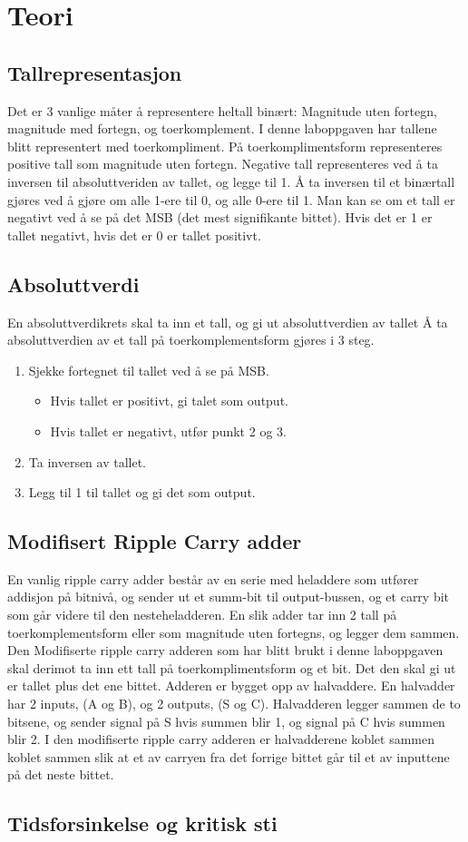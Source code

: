 \section{Teori}
  \subsection{Tallrepresentasjon}
    Det er 3 vanlige måter å representere heltall binært: Magnitude uten fortegn, magnitude med fortegn,
    og toerkomplement.
    I denne laboppgaven har tallene blitt representert med toerkompliment.
    På toerkomplimentsform representeres positive tall som magnitude uten fortegn.
    Negative tall representeres ved å ta inversen til absoluttveriden av tallet, og legge til 1.
    Å ta inversen til et binærtall gjøres ved å gjøre om alle 1-ere til 0, og alle 0-ere til 1.
    Man kan se om et tall er negativt ved å se på det MSB (det mest signifikante bittet). Hvis det er 1 er tallet negativt,
    hvis det er 0 er tallet positivt.
  \subsection{Absoluttverdi}
    En absoluttverdikrets skal ta inn et tall, og gi ut absoluttverdien av tallet
    Å ta absoluttverdien av et tall på toerkomplementsform gjøres i 3 steg.
    \begin{enumerate}
      \item Sjekke fortegnet til tallet ved å se på MSB.
      \begin{itemize}
        \item Hvis tallet er positivt, gi talet som output.
        \item Hvis tallet er negativt, utfør punkt 2 og 3.
      \end{itemize}
      \item Ta inversen av tallet.
      \item Legg til 1 til tallet og gi det som output.
    \end{enumerate}
  \subsection{Modifisert Ripple Carry adder}
    En vanlig ripple carry adder består av en serie med heladdere som utfører addisjon på bitnivå, og sender ut et summ-bit til output-bussen, og et carry bit som går videre til den nesteheladderen. En slik adder tar inn 2 tall på toerkomplementsform eller som magnitude uten fortegns, og legger dem sammen. Den Modifiserte ripple carry adderen som har blitt brukt i denne laboppgaven skal derimot ta inn
    ett tall på toerkomplimentsform og et bit. Det den skal gi ut er tallet plus det ene bittet.
    Adderen er bygget opp av halvaddere. En halvadder har 2 inputs, (A og B), og 2 outputs, (S og C).
    Halvadderen legger sammen de to bitsene, og sender signal på S hvis summen blir 1, og signal på C hvis summen blir 2.
    I den modifiserte ripple carry adderen er halvadderene koblet sammen koblet sammen slik at et av carryen fra det forrige bittet går til et av inputtene på det neste bittet.
  \subsection{Tidsforsinkelse og kritisk sti}
